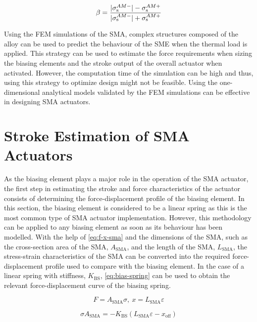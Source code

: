 \begin{equation}
    \label{eq:fem-beta}
    \beta = \frac{|\sigma_\mathrm{s}^{AM-}|-\sigma_\mathrm{s}^{AM+}}{|\sigma_\mathrm{s}^{AM-}|+\sigma_\mathrm{s}^{AM+}}
\end{equation}

Using the FEM simulations of the SMA, complex structures composed of the alloy can be used to predict the behaviour of the SME when the thermal load is applied. This strategy can be used to estimate the force requirements when sizing the biasing elements and the stroke output of the overall actuator when activated. However, the computation time of the simulation can be high and thus, using this strategy to optimize design might not be feasible. Using the one-dimensional analytical models validated by the FEM simulations can be effective in designing SMA actuators.

\section{Stroke Estimation of SMA Actuators}
As the biasing element plays a major role in the operation of the SMA actuator, the first step in estimating the stroke and force characteristics of the actuator consists of determining the force-displacement profile of the biasing element. In this section, the biasing element is considered to be a linear spring as this is the most common type of SMA actuator implementation. However, this methodology can be applied to any biasing element as soon as its behaviour has been modelled. With the help of \cref{eq:f-x-sma} and the dimensions of the SMA, such as the cross-section area of the SMA, $A_\mathrm{SMA}$, and the length of the SMA, $L_\mathrm{SMA}$, the stress-strain characteristics of the SMA can be converted into the required force-displacement profile used to compare with the biasing element. In the case of a linear spring with stiffness, $K_\mathrm{BS}$, \cref{eq:bias-spring} can be used to obtain the relevant force-displacement curve of the biasing spring.

\begin{equation}
    \label{eq:f-x-sma}
    F = A_\mathrm{SMA}\sigma,~x = L_\mathrm{SMA}\varepsilon
\end{equation}

\begin{equation}
    \label{eq:bias-spring}
    \sigma A_\mathrm{SMA} = -K_\mathrm{BS}\left(L_\mathrm{SMA}\varepsilon-x_\mathrm{off}\right)
\end{equation}

